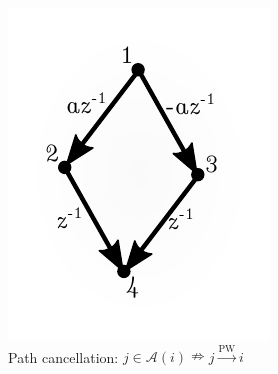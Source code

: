 \documentclass{statsoc}
\def\pwgc{\overset{\text{PW}}{\rightarrow}}  %
\newcommand{\anc}[1]{\mathcal{A}(#1)}  %
\begin{document}
\begin{figure}
  \centering
  \caption{Examples illustrating the difficulty of obtaining a converse to Proposition \ref{prop:ancestor_properties}}
  \begin{subfigure}[b]{0.35\textwidth}
    \includegraphics[width=\linewidth]{example1.pdf}
    \caption{Path cancellation: $j \in \anc{i} \nRightarrow j \pwgc i$}
    \label{fig:diamond_cancellation}
  \end{subfigure}
  \begin{subfigure}[b]{0.35\textwidth}

\end{subfigure}
\end{figure}
\end{document}
